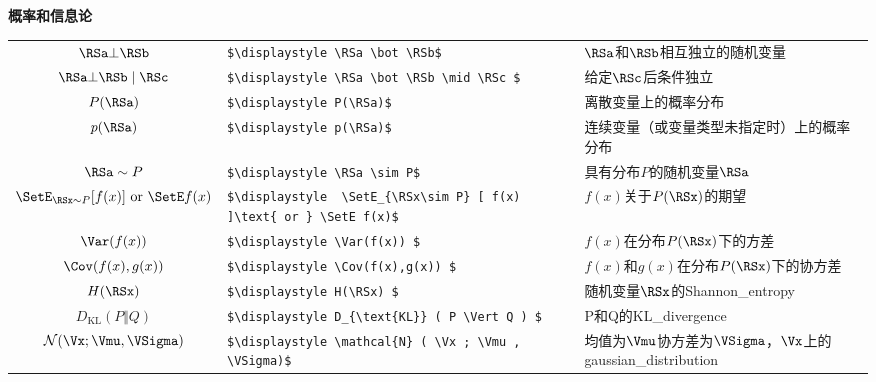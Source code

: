 \vspace{\notationgap}
\begin{minipage}{\textwidth}
\centerline{\bf 概率和信息论}
\bgroup
\def\arraystretch{1.5}
\begin{tabular}{clp{3.25in}}
$\displaystyle \RSa \bot \RSb$ 												&\lstinline!$\displaystyle \RSa \bot \RSb$ 											!						&  $\RSa$和$\RSb$相互独立的随机变量 \\
$\displaystyle \RSa \bot \RSb \mid \RSc $ 									&\lstinline!$\displaystyle \RSa \bot \RSb \mid \RSc $ 								!									&  给定$\RSc$后条件独立 \\
$\displaystyle P(\RSa)$ 													&\lstinline!$\displaystyle P(\RSa)$ 												!					& 离散变量上的概率分布 \\
$\displaystyle p(\RSa)$ 													&\lstinline!$\displaystyle p(\RSa)$ 												!					& 连续变量（或变量类型未指定时）上的概率分布  \\
$\displaystyle \RSa \sim P$ 												&\lstinline!$\displaystyle \RSa \sim P$ 											!						&  具有分布$P$的随机变量$\RSa$\\
$\displaystyle  \SetE_{\RSx\sim P} [ f(x) ]\text{ or } \SetE f(x)$ 			&\lstinline!$\displaystyle  \SetE_{\RSx\sim P} [ f(x) ]\text{ or } \SetE f(x)$ 		!															& $f(x)$关于$P(\RSx)$的期望 \\
$\displaystyle \Var(f(x)) $ 												&\lstinline!$\displaystyle \Var(f(x)) $ 											!						&  $f(x)$在分布$P(\RSx)$下的方差 \\
$\displaystyle \Cov(f(x),g(x)) $ 											&\lstinline!$\displaystyle \Cov(f(x),g(x)) $ 										!							&  $f(x)$和$g(x)$在分布$P(\RSx)$下的协方差 \\
$\displaystyle H(\RSx) $ 													&\lstinline!$\displaystyle H(\RSx) $ 												!					& 随机变量$\RSx$的\gls{Shannon_entropy} \\
$\displaystyle D_{\text{KL}} ( P \Vert Q ) $ 								&\lstinline!$\displaystyle D_{\text{KL}} ( P \Vert Q ) $ 							!										& P和Q的\gls{KL_divergence} \\
$\displaystyle \mathcal{N} ( \Vx ; \Vmu , \VSigma)$ 						&\lstinline!$\displaystyle \mathcal{N} ( \Vx ; \Vmu , \VSigma)$ 					!												& 均值为$\Vmu$协方差为$\VSigma$，$\Vx$上的\gls{gaussian_distribution} \\
\end{tabular}
\egroup
\end{minipage}

